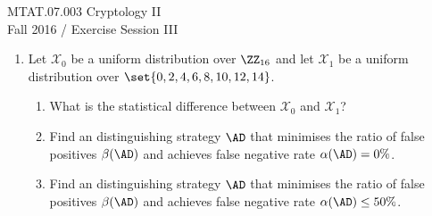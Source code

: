 \documentclass{article}
\begin{document}
\noindent	
MTAT.07.003 Cryptology II\\
Fall 2016 / Exercise Session III 


\begin{enumerate}


\item Let $\mathcal{X}_0$ be a uniform distribution over $\ZZ_{16}$
  and let $\mathcal{X}_1$ be a uniform distribution over
  $\set{0,2,4,6,8,10,12,14}$. 
  \begin{enumerate}
  \item What is the statistical difference between $\mathcal{X}_0$ and $\mathcal{X}_1$?
  \item Find an distinguishing strategy $\AD$ that minimises the ratio
    of false positives $\beta(\AD)$ and achieves false negative rate
    $\alpha(\AD)=0\%$.

  \item Find an distinguishing strategy $\AD$ that minimises the ratio
    of false positives $\beta(\AD)$ and achieves false negative rate
    $\alpha(\AD)\leq 50\%$.


\end{enumerate}
\end{enumerate}
\end{document}
